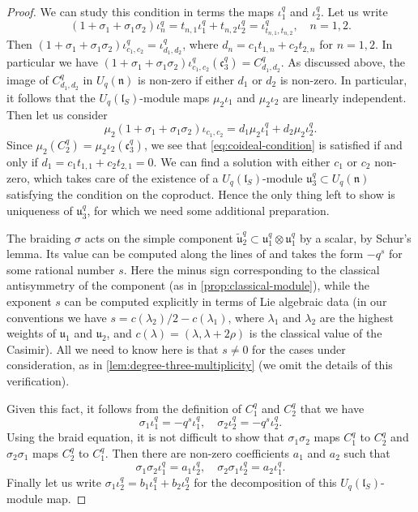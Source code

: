 \documentclass[a4paper, 12pt, reqno, english]{amsart}
\numberwithin{equation}{section}
\numberwithin{figure}{section}
\theoremstyle{plain}
\theoremstyle{plain}
\theoremstyle{plain}
\theoremstyle{plain}
\theoremstyle{plain}
\theoremstyle{definition}
\theoremstyle{definition}
\theoremstyle{definition}
\theoremstyle{remark}
\theoremstyle{definition}
\theoremstyle{definition}
\newcommand{\Uqn}{U_q(\mathfrak{n})}
\newcommand{\UqlS}{U_q(\mathfrak{l}_S)}
\newcommand{\liec}{\mathfrak{c}}
\newcommand{\lieu}{\mathfrak{u}}
\begin{document}
\begin{proof}
We can study this condition in terms the maps $\iota^q_1$ and $\iota^q_2$.
Let us write
\[
(1 + \sigma_1 + \sigma_1 \sigma_2) \iota^q_n = t_{n, 1} \iota^q_1 + t_{n, 2} \iota^q_2 = \iota^q_{t_{n, 1}, t_{n, 2}}, \quad n = 1, 2.
\]
Then $(1 + \sigma_1 + \sigma_1 \sigma_2) \iota^q_{c_1, c_2} = \iota^q_{d_1, d_2}$, where $d_n = c_1 t_{1, n} + c_2 t_{2, n}$ for $n = 1, 2$.
In particular we have $(1 + \sigma_1 + \sigma_1 \sigma_2) \iota^q_{c_1, c_2} (\liec^q_3) = C^q_{d_1, d_2}$.
As discussed above, the image of $C^q_{d_1, d_2}$ in $\Uqn$ is non-zero if either $d_1$ or $d_2$ is non-zero.
In particular, it follows that the $\UqlS$-module maps $\mu_2 \iota_1$ and $\mu_2 \iota_2$ are linearly independent.
Then let us consider
\[
\mu_2 (1 + \sigma_1 + \sigma_1 \sigma_2) \iota_{c_1, c_2} = d_1 \mu_2 \iota^q_1 + d_2 \mu_2 \iota^q_2.
\]
Since $\mu_2(C^q_2) = \mu_2 \iota_2 (\liec^q_3)$, we see that \eqref{eq:coideal-condition} is satisfied if and only if $d_1 = c_1 t_{1, 1} + c_2 t_{2, 1} = 0$.
We can find a solution with either $c_1$ or $c_2$ non-zero, which takes care of the existence of a $\UqlS$-module $\lieu^q_3 \subset \Uqn$ satisfying the condition on the coproduct.
Hence the only thing left to show is uniqueness of $\lieu^q_3$, for which we need some additional preparation.

The braiding $\sigma$ acts on the simple component $\tilde{\lieu}^q_2 \subset \lieu^q_1 \otimes \lieu^q_1$ by a scalar, by Schur's lemma.
Its value can be computed along the lines of \cite[Section 8.4, Corollary 23]{klsc} and takes the form $- q^s$ for some rational number $s$.
Here the minus sign corresponding to the classical antisymmetry of the component (as in \cref{prop:classical-module}), while the exponent $s$ can be computed explicitly in terms of Lie algebraic data (in our conventions we have $s = c(\lambda_2) / 2 - c(\lambda_1)$, where $\lambda_1$ and $\lambda_2$ are the highest weights of $\lieu_1$ and $\lieu_2$, and $c(\lambda) = (\lambda, \lambda + 2 \rho)$ is the classical value of the Casimir).
All we need to know here is that $s \neq 0$ for the cases under consideration, as in \cref{lem:degree-three-multiplicity} (we omit the details of this verification).

Given this fact, it follows from the definition of $C^q_1$ and $C^q_2$ that we have
\[
\sigma_1 \iota^q_1 = - q^s \iota^q_1, \quad
\sigma_2 \iota^q_2 = - q^s \iota^q_2.
\]
Using the braid equation, it is not difficult to show that $\sigma_1 \sigma_2$ maps $C^q_1$ to $C^q_2$ and $\sigma_2 \sigma_1$ maps $C^q_2$ to $C^q_1$.
Then there are non-zero coefficients $a_1$ and $a_2$ such that
\[
\sigma_1 \sigma_2 \iota^q_1 = a_1 \iota^q_2, \quad
\sigma_2 \sigma_1 \iota^q_2 = a_2 \iota^q_1.
\]
Finally let us write $\sigma_1 \iota^q_2 = b_1 \iota^q_1 + b_2 \iota^q_2$ for the decomposition of this $\UqlS$-module map.


\end{proof}
\end{document}
